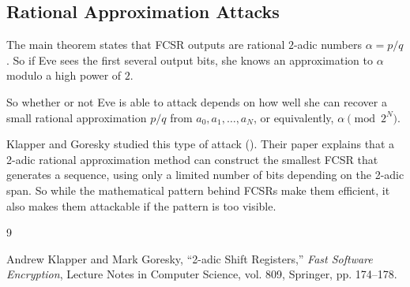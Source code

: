 \documentclass[12pt]{amsart}
\theoremstyle{plain}
\theoremstyle{definition}
\theoremstyle{remark}
\begin{document}
\subsection{Rational Approximation Attacks}
The main theorem states that FCSR outputs are rational $2$-adic numbers $\alpha = p/q$. So if Eve sees the first several output bits, she knows an approximation to $\alpha$ modulo a high power of $2$.

So whether or not Eve is able to attack depends on how well she can recover a small rational approximation $p/q$ from $a_0, a_1, \ldots, a_N$, or equivalently, $\alpha \pmod{2^N}$.

Klapper and Goresky studied this type of attack (\cite{KG}). Their paper explains that a 2-adic rational approximation method can construct the smallest FCSR that generates a sequence, using only a limited number of bits depending on the 2-adic span. So while the mathematical pattern behind FCSRs make them efficient, it also makes them attackable if the pattern is too visible.

\begin{thebibliography}{9}

Andrew Klapper and Mark Goresky, “2-adic Shift Registers,” \textit{Fast Software Encryption}, Lecture Notes in Computer Science, vol. 809, Springer, pp. 174–178.

\end{thebibliography}
\end{document}
